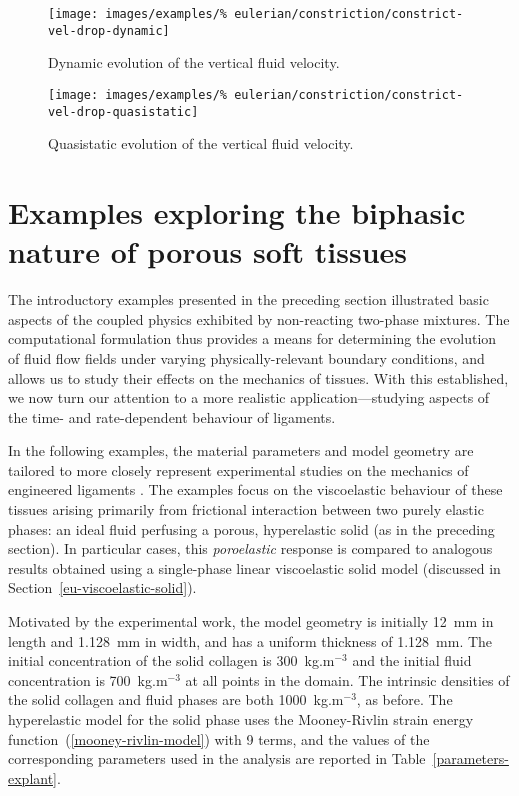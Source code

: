 \begin{figure}[!hptb]
  \centering
  \texttt{[image: images/examples/\%
    eulerian/constriction/constrict-vel-drop-dynamic]}
  \caption{Dynamic evolution of the vertical fluid velocity.}
  \label{velocity-evolution-dynamic}
\end{figure}

\begin{figure}[!hptb]
  \centering
  \texttt{[image: images/examples/\%
    eulerian/constriction/constrict-vel-drop-quasistatic]}
  \caption{Quasistatic evolution of the vertical fluid velocity.}
  \label{velocity-evolution-quasistatic}
\end{figure}

\clearpage

\section{Examples exploring the biphasic nature of porous soft
  tissues}
\label{biphasic-examples-2}

The introductory examples presented in the preceding section
illustrated basic aspects of the coupled physics exhibited by
non-reacting two-phase mixtures. The computational formulation thus
provides a means for determining the evolution of fluid flow fields
under varying physically-relevant boundary conditions, and allows us
to study their effects on the mechanics of tissues. With this
established, we now turn our attention to a more realistic
application---studying aspects of the time- and rate-dependent
behaviour of ligaments.

In the following examples, the material parameters and model geometry
are tailored to more closely represent experimental studies on the
mechanics of engineered ligaments \citep{Syed-Picard:06}. The examples
focus on the viscoelastic behaviour of these tissues arising primarily
from frictional interaction between two purely elastic phases: an
ideal fluid perfusing a porous, hyperelastic solid (as in the
preceding section). In particular cases, this {\em poroelastic}
response is compared to analogous results obtained using a
single-phase linear viscoelastic solid model (discussed in
Section~\ref{eu-viscoelastic-solid}).

Motivated by the experimental work, the model geometry is initially
12~mm in length and 1.128~mm in width, and has a uniform thickness of
1.128~mm. The initial concentration of the solid collagen is
300~kg.m$^{-3}$ and the initial fluid concentration is 700~kg.m$^{-3}$
at all points in the domain. The intrinsic densities of the solid
collagen and fluid phases are both 1000~kg.m$^{-3}$, as before. The
hyperelastic model for the solid phase uses the Mooney-Rivlin strain
energy function~(\ref{mooney-rivlin-model}) with 9 terms, and the
values of the corresponding parameters used in the analysis are
reported in Table~\ref{parameters-explant}.

